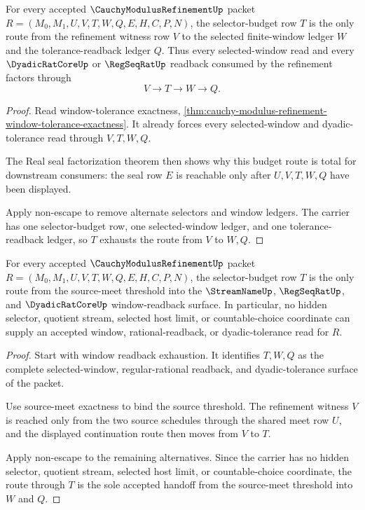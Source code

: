 \begin{theorem}
\label{thm:cauchy-modulus-refinement-selector-budget-totality}
For every accepted $\CauchyModulusRefinementUp$ packet $R=(M_0,M_1,U,V,T,W,Q,E,H,C,P,N)$, the selector-budget row $T$ is the only route from the refinement witness row $V$ to the selected finite-window ledger $W$ and the tolerance-readback ledger $Q$. Thus every selected-window read and every $\DyadicRatCoreUp$ or $\RegSeqRatUp$ readback consumed by the refinement factors through
$$
V \longrightarrow T \longrightarrow W \longrightarrow Q.
$$
\end{theorem}
\begin{proof}
Read window-tolerance exactness, \autoref{thm:cauchy-modulus-refinement-window-tolerance-exactness}. It already forces every selected-window and dyadic-tolerance read through $V,T,W,Q$.

The Real seal factorization theorem then shows why this budget route is total for downstream consumers: the seal row $E$ is reachable only after $U,V,T,W,Q$ have been displayed.

Apply non-escape to remove alternate selectors and window ledgers. The carrier has one selector-budget row, one selected-window ledger, and one tolerance-readback ledger, so $T$ exhausts the route from $V$ to $W,Q$.
\end{proof}

\begin{theorem}
\label{thm:cauchy-modulus-refinement-selector-budget-nonescape}
For every accepted $\CauchyModulusRefinementUp$ packet $R=(M_0,M_1,U,V,T,W,Q,E,H,C,P,N)$, the selector-budget row $T$ is the only route from the source-meet threshold into the $\StreamNameUp$, $\RegSeqRatUp$, and $\DyadicRatCoreUp$ window-readback surface. In particular, no hidden selector, quotient stream, selected host limit, or countable-choice coordinate can supply an accepted window, rational-readback, or dyadic-tolerance read for $R$.
\end{theorem}
\begin{proof}
Start with window readback exhaustion. It identifies $T,W,Q$ as the complete selected-window, regular-rational readback, and dyadic-tolerance surface of the packet.

Use source-meet exactness to bind the source threshold. The refinement witness $V$ is reached only from the two source schedules through the shared meet row $U$, and the displayed continuation route then moves from $V$ to $T$.

Apply non-escape to the remaining alternatives. Since the carrier has no hidden selector, quotient stream, selected host limit, or countable-choice coordinate, the route through $T$ is the sole accepted handoff from the source-meet threshold into $W$ and $Q$.
\end{proof}

